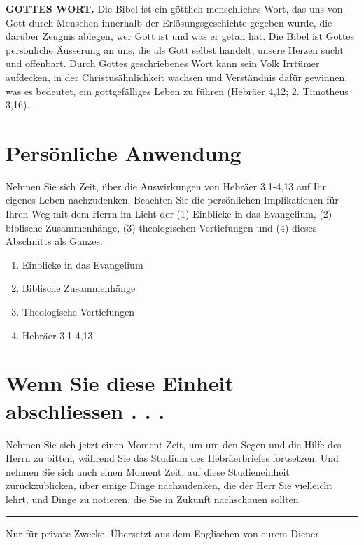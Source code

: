 \documentclass[headsepline=true]{book}
\providecommand{\tightlist}{%
  \setlength{\itemsep}{0pt}\setlength{\parskip}{0pt}}
\begin{document}
\textbf{GOTTES WORT.} Die Bibel ist ein göttlich-menschliches Wort, das
uns von Gott durch Menschen innerhalb der Erlösungsgeschichte gegeben
wurde, die darüber Zeugnis ablegen, wer Gott ist und was er getan hat.
Die Bibel ist Gottes persönliche Äusserung an uns, die als Gott selbst
handelt, unsere Herzen sucht und offenbart. Durch Gottes geschriebenes
Wort kann sein Volk Irrtümer aufdecken, in der Christusähnlichkeit
wachsen und Verständnis dafür gewinnen, was es bedeutet, ein
gottgefälliges Leben zu führen (Hebräer 4,12; 2. Timotheus 3,16).

\section{Persönliche Anwendung}\label{persuxf6nliche-anwendung-2}

Nehmen Sie sich Zeit, über die Auswirkungen von Hebräer 3,1-4,13 auf Ihr
eigenes Leben nachzudenken. Beachten Sie die persönlichen Implikationen
für Ihren Weg mit dem Herrn im Licht der (1) Einblicke in das
Evangelium, (2) biblische Zusammenhänge, (3) theologischen Vertiefungen
und (4) dieses Abschnitts als Ganzes.

\begin{enumerate}
\def\labelenumi{\arabic{enumi}.}
\tightlist
\item
  Einblicke in das Evangelium
\item
  Biblische Zusammenhänge
\item
  Theologische Vertiefungen
\item
  Hebräer 3,1-4,13
\end{enumerate}

\section{Wenn Sie diese Einheit abschliessen . .
.}\label{wenn-sie-diese-einheit-abschliessen-.-.-.-2}

Nehmen Sie sich jetzt einen Moment Zeit, um um den Segen und die Hilfe
des Herrn zu bitten, während Sie das Studium des Hebräerbriefes
fortsetzen. Und nehmen Sie sich auch einen Moment Zeit, auf diese
Studieneinheit zurückzublicken, über einige Dinge nachzudenken, die der
Herr Sie vielleicht lehrt, und Dinge zu notieren, die Sie in Zukunft
nachschauen sollten.

\begin{center}\rule{0.5\linewidth}{0.5pt}\end{center}

Nur für private Zwecke. Übersetzt aus dem Englischen von eurem Diener
\end{document}

